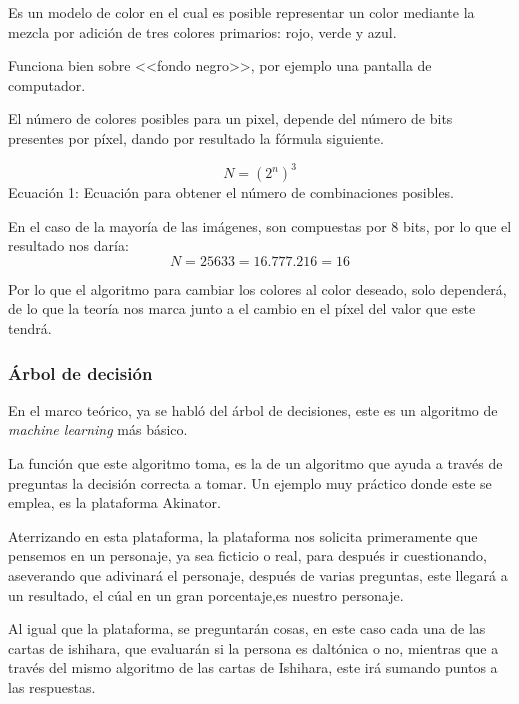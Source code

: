 \documentclass[10pt]{article}
\begin{document}
Es un modelo de color en el cual es posible representar un color mediante la mezcla por adición de tres colores primarios: rojo, verde y azul\cite{IEEEreferencias:Ref43}.

Funciona bien sobre <<fondo negro>>, por ejemplo una pantalla de computador\cite{IEEEreferencias:Ref43}.

El número de colores posibles para un pixel, depende del número de bits presentes por píxel, dando por resultado la fórmula siguiente.


\begin{equation}\label{ecuacion 1}
N = (2^n)^3
\end{equation}
Ecuación 1: Ecuación para obtener el número de combinaciones posibles.

En el caso de la mayoría de las imágenes, son compuestas por 8 bits, por lo que el resultado nos daría:
\newline
\begin{equation}\label{ecuacion2}
N=25633=16.777.216=16 
\end{equation}

\setlength{\parskip}{2mm}
Por lo que el algoritmo para cambiar los colores al color deseado, solo dependerá, de lo que la teoría nos marca junto a el cambio en el píxel del valor que este tendrá.

\subsubsection{Árbol de decisión}
En el marco teórico, ya se habló del árbol de decisiones, este es un algoritmo de  \textit{machine learning} más básico.

La función que este algoritmo toma, es la de un algoritmo que ayuda a través de preguntas la decisión correcta a tomar. Un ejemplo muy práctico donde este se emplea, es la plataforma Akinator\textcopyright.

Aterrizando en esta plataforma, la plataforma nos solicita primeramente que pensemos en un personaje, ya sea ficticio o real, para después ir cuestionando, aseverando que adivinará el personaje, después de varias preguntas, este llegará a un resultado, el cúal en un gran porcentaje,es nuestro personaje.

Al igual que la plataforma, se preguntarán cosas, en este caso cada una de las cartas de ishihara, que evaluarán si la persona es daltónica o no, mientras que a través del mismo algoritmo de las cartas de Ishihara, este irá sumando puntos a las respuestas.
\end{document}
